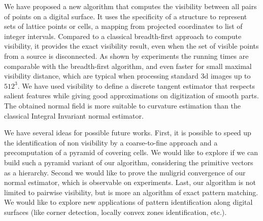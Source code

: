 We have proposed a new algorithm that computes the visibility between
all pairs of points on a digital surface. It uses the specificity of a
structure to represent sets of lattice points or cells, a mapping from
projected coordinates to list of integer intervals. Compared to a
classical breadth-first approach to compute visibility, it provides
the exact visibility result, even when the set of visible points
from a source is disconnected. As shown by experiments the running
times are comparable with the breadth-first algorithm, and even faster
for small maximal visibility distance, which are typical when
processing standard 3d images up to $512^3$. We have used visibility
to define a discrete tangent estimator that respects salient features
while giving good approximations on digitization of smooth parts. The
obtained normal field is more suitable to curvature estimation than
the classical Integral Invariant normal estimator.

We have several ideas for possible future works. First, it is possible
to speed up the identification of non visibility by a coarse-to-fine
approach and a precomputation of a pyramid of covering cells. We would
like to explore if we can build such a pyramid variant of our
algorithm, considering the primitive vectors as a hierarchy. Second we
would like to prove the muligrid convergence of our normal estimator,
which is observable on experiments. Last, our algorithm is not limited
to pairwise visibility, but is more an algorithm of exact pattern
matching. We would like to explore new applications of pattern
identification along digital surfaces (like corner detection, locally
convex zones identification, etc.).
